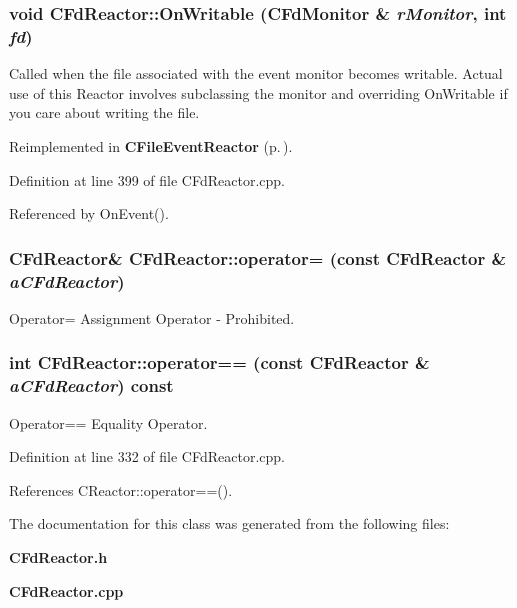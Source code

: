 \subsubsection{\setlength{\rightskip}{0pt plus 5cm}void CFd\-Reactor::On\-Writable ({\bf CFd\-Monitor} \& {\em r\-Monitor}, int {\em fd})\hspace{0.3cm}{\tt  [virtual]}}\label{classCFdReactor_a7}


Called when the file associated with the event monitor becomes writable. Actual use of this Reactor involves subclassing the monitor and overriding On\-Writable if you care about writing the file. 

Reimplemented in {\bf CFile\-Event\-Reactor} {\rm (p.\,\pageref{classCFileEvent_1_1CFileEventReactor_a3})}.

Definition at line 399 of file CFd\-Reactor.cpp.

Referenced by On\-Event().
\subsubsection{\setlength{\rightskip}{0pt plus 5cm}CFd\-Reactor\& CFd\-Reactor::operator= (const CFd\-Reactor \& {\em a\-CFd\-Reactor})\hspace{0.3cm}{\tt  [private]}}\label{classCFdReactor_c1}


Operator= Assignment Operator - Prohibited.

\subsubsection{\setlength{\rightskip}{0pt plus 5cm}int CFd\-Reactor::operator== (const CFd\-Reactor \& {\em a\-CFd\-Reactor}) const}\label{classCFdReactor_a4}


Operator== Equality Operator.



Definition at line 332 of file CFd\-Reactor.cpp.

References CReactor::operator==().

The documentation for this class was generated from the following files:\begin{CompactItemize}
\item 
{\bf CFd\-Reactor.h}\item 
{\bf CFd\-Reactor.cpp}\end{CompactItemize}
